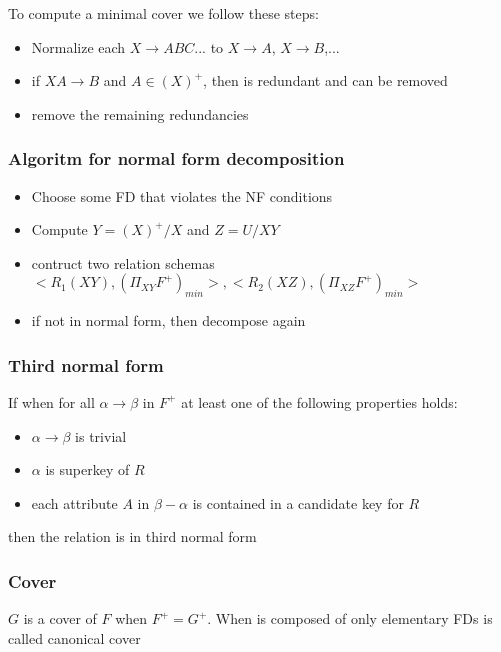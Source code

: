 \documentclass[12pt, a4paper]{article}
\begin{document}
To compute a minimal cover we follow these steps:
\begin{itemize}
    \item Normalize each $X\to ABC...$ to $X\to A$, $X\to B$,...
    \item if $XA\to B$ and $A\in (X)^{+}$, then is redundant and can be removed
    \item remove the remaining redundancies
\end{itemize}

\subsubsection*{Algoritm for normal form decomposition}
\begin{itemize}
    \item Choose some FD that violates the NF conditions
    \item Compute $Y=(X)^{+}/X$ and $Z=U/XY$
    \item contruct two relation schemas
    \subitem $<R_{1}(XY),(\Pi_{XY}F^{+})_{min}>,<R_{2}(XZ),(\Pi_{XZ}F^{+})_{min}>$
    \item if not in normal form, then decompose again
\end{itemize}

\subsubsection*{Third normal form}
If when for all $\alpha\to\beta$ in $F^{+}$ at least one of the following properties holds:
\begin{itemize}
    \item $\alpha\to\beta$ is trivial
    \item $\alpha$ is superkey of $R$
    \item each attribute $A$ in $\beta-\alpha$ is contained in a candidate key for $R$
\end{itemize}
then the relation is in third normal form

\subsubsection*{Cover}
$G$ is a cover of $F$ when $F^{+}=G^{+}$. When is composed of only elementary FDs is called canonical cover
\end{document}
